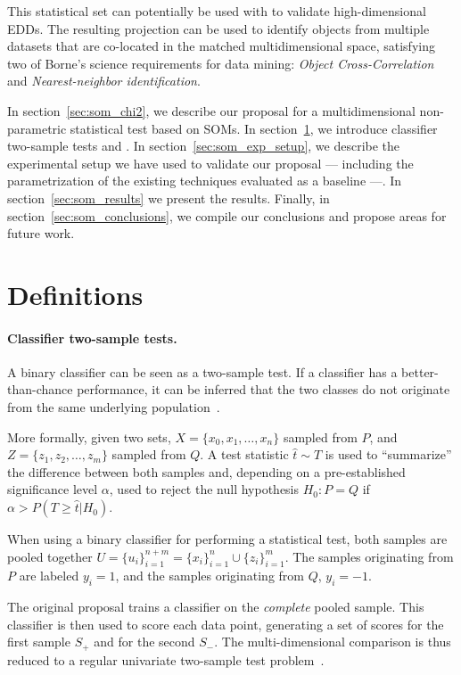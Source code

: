 This statistical set can potentially be used with \PresQ to validate
high-dimensional \glspl{EDD}. The resulting projection can be used to identify objects
from multiple datasets that are co-located in the matched multidimensional space, satisfying
two of Borne's science requirements for data mining: \emph{Object Cross-Correlation} and
\emph{Nearest-neighbor identification}.

In section~\ref{sec:som_chi2}, we describe our proposal
for a multidimensional non-parametric statistical test based on \glspl{SOM}.
In section~\ref{sec:som_definitions}, we introduce classifier two-sample tests
and .
In section~\ref{sec:som_exp_setup}, we describe the experimental setup we have used
to validate our proposal --- including the parametrization of the existing techniques
evaluated as a baseline ---. In section~\ref{sec:som_results} we present the results.
Finally, in section~\ref{sec:som_conclusions}, we compile our conclusions and propose areas for future
work.


\section{Definitions}
\label{sec:som_definitions}

\paragraph{Classifier two-sample tests.}
\label{sec:som_classifier2sample}
A binary classifier can be seen as a two-sample test. If a classifier has a better-than-chance
performance, it can be inferred that the two classes do not originate from the same underlying
population~\cite{friedman2004multivariate}. 

More formally, given two sets, $X = \{x_0,x_1,\ldots,x_n\}$ sampled from $P$, and \linebreak
$Z = \{z_1,z_2,\ldots,z_m\}$ sampled from $Q$. A test statistic $\hat t \sim T$ is used to
``summarize'' the difference between both samples and, depending on a pre-established
significance level $\alpha$, used to reject the null hypothesis
$H_0: P = Q$ if $\alpha > P(T \ge \hat t | H_0)$.

When using a binary classifier for performing a statistical test, both samples are pooled
together $U = \{u_i\}_{i=1}^{n+m} = \{x_i\}_{i=1}^n \cup \{z_i\}_{i=1}^m$.
The samples originating from $P$ are labeled $y_i=1$, and the samples originating
from $Q$, $y_i=-1$.

The original proposal trains a classifier on the \emph{complete} pooled sample.
This classifier is then used to score each data point, generating a set of scores
for the first sample $S_+$ and for the second $S_-$. The multi-dimensional comparison
is thus reduced to a regular univariate two-sample test problem~\cite{friedman2004multivariate}.

